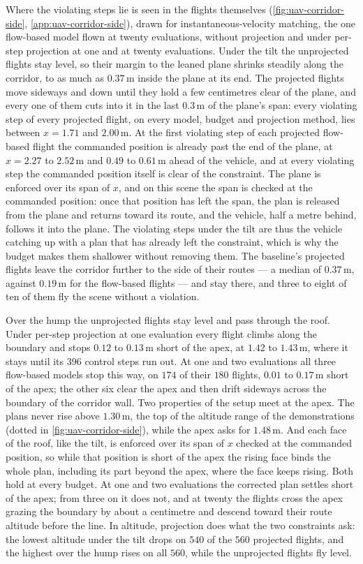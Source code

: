 Where the violating steps lie is seen in the flights themselves (\autoref{fig:uav-corridor-side},
\autoref{app:uav-corridor-side}), drawn
for instantaneous-velocity matching, the one flow-based model flown at twenty evaluations, without
projection and under per-step projection at one and at twenty evaluations. Under the tilt the unprojected
flights stay level, so their margin to the leaned plane shrinks steadily along the corridor, to as much
as $0.37$\,m inside the plane at its end. The projected flights move sideways and down until they hold a few
centimetres clear of the plane, and every one of them cuts into it in the last $0.3$\,m of the plane's
span: every violating step of every projected flight, on every model, budget and projection method, lies
between $x=1.71$ and $2.00$\,m. At the first violating step of each projected flow-based flight the
commanded position is already past the end of the plane, at $x=2.27$ to $2.52$\,m and $0.49$ to
$0.61$\,m ahead of the vehicle, and at every violating step the commanded position itself is clear of the
constraint. The plane is enforced over its span of $x$, and on this scene the span is checked at the
commanded position: once that position has left the span, the plan is released from the plane and
returns toward its route, and the vehicle, half a metre behind, follows it into the plane. The violating
steps under the tilt are thus the vehicle catching up with a plan that has already left the constraint,
which is why the budget makes them shallower without removing them. The baseline's projected flights leave
the corridor further to the side of their routes --- a median of $0.37$\,m, against $0.19$\,m for the
flow-based flights --- and stay there, and three to eight of ten of them fly the scene without a
violation.

Over the hump the unprojected flights stay level and pass through the roof. Under per-step projection at one
evaluation every flight climbs along the boundary and stops $0.12$ to $0.13$\,m short of the apex, at
$1.42$ to $1.43$\,m, where it stays until its $396$ control steps run out. At one and two evaluations
all three flow-based models stop this way, on $174$ of their $180$ flights, $0.01$ to $0.17$\,m short of
the apex; the other six clear the apex and then drift sideways across the boundary of the corridor wall.
Two properties of the setup meet at the apex. The plans never rise above $1.30$\,m, the top of the
altitude range of the demonstrations (dotted in \autoref{fig:uav-corridor-side}), while the apex asks for
$1.48$\,m. And each face of the roof, like the tilt, is enforced over its span of $x$ checked at the
commanded position, so while that position is short of the apex the rising face binds the whole plan,
including its part beyond the apex, where the face keeps rising. Both hold at every budget. At one and
two evaluations the corrected plan settles short of the apex; from three on it does not, and at twenty
the flights cross the apex grazing the boundary by about a centimetre and descend toward their route
altitude before the line. In altitude, projection does what the two constraints ask: the lowest altitude
under the tilt drops on $540$ of the $560$ projected flights, and the highest over the hump rises on all
$560$, while the unprojected flights fly level.

